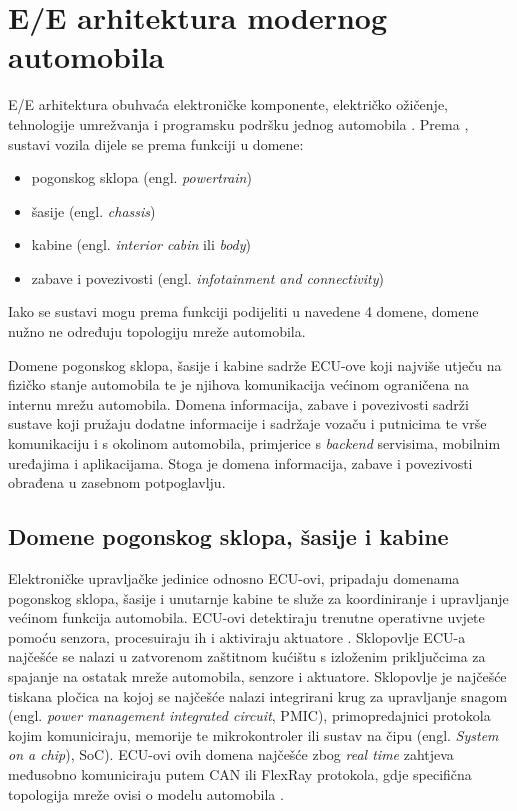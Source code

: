\documentclass[times, utf8, diplomski, numeric]{fer}
\begin{document}
\section{E/E arhitektura modernog automobila}
E/E arhitektura obuhvaća elektroničke komponente, električko ožičenje, tehnologije umrežvanja i programsku podršku jednog automobila \cite{nasser2023automotive}. Prema \cite{nasser2023automotive, koscher2010, knight2020hacking, huq2020driving, aliwa2021cyberattacks}, sustavi vozila dijele se prema funkciji u domene:

\begin{itemize}
    \item pogonskog sklopa (engl. \textit{powertrain})
    \item šasije (engl. \textit{chassis})
    \item kabine (engl. \textit{interior cabin} ili \textit{body})
    \bigskip
    \item zabave i povezivosti (engl. \textit{infotainment and connectivity})
\end{itemize}

Iako se sustavi mogu prema funkciji podijeliti u navedene 4 domene, domene nužno ne određuju topologiju mreže automobila.

Domene pogonskog sklopa, šasije i kabine sadrže ECU-ove koji najviše utječu na fizičko stanje automobila te je njihova komunikacija većinom ograničena na internu mrežu automobila. Domena informacija, zabave i povezivosti sadrži sustave koji pružaju dodatne informacije i sadržaje vozaču i putnicima te vrše komunikaciju i s okolinom automobila, primjerice s \textit{backend} servisima, mobilnim uređajima i aplikacijama. Stoga je domena informacija, zabave i povezivosti obrađena u zasebnom potpoglavlju.   
\subsection{Domene pogonskog sklopa, šasije i kabine}
Elektroničke upravljačke jedinice odnosno ECU-ovi, pripadaju domenama pogonskog sklopa, šasije i unutarnje kabine te služe za koordiniranje i upravljanje većinom funkcija automobila. ECU-ovi detektiraju trenutne operativne uvjete pomoću senzora, procesuiraju ih i aktiviraju aktuatore \cite{bosch2022handbook}. Sklopovlje ECU-a najčešće se nalazi u zatvorenom zaštitnom kućištu s izloženim priključcima za spajanje na ostatak mreže automobila, senzore i aktuatore. Sklopovlje je najčešće tiskana pločica na kojoj se najčešće nalazi integrirani krug za upravljanje snagom (engl. \textit{power management integrated circuit}, PMIC), primopredajnici protokola kojim komuniciraju, memorije te mikrokontroler ili sustav na čipu (engl. \textit{System on a chip}), SoC)\cite{nasser2023automotive}. ECU-ovi ovih domena najčešće zbog \textit{real time} zahtjeva međusobno komuniciraju putem CAN ili FlexRay protokola, gdje specifična topologija mreže ovisi o modelu automobila \cite{bosch2022handbook}.
\end{document}

